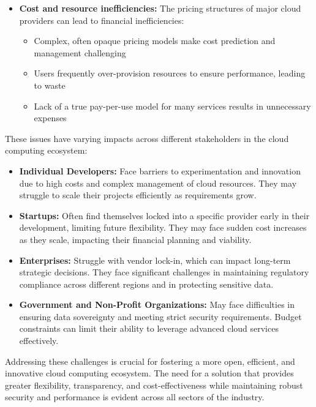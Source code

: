 \begin{itemize}
    \item \textbf{Cost and resource inefficiencies:} The pricing structures of major cloud providers can lead to financial inefficiencies:
    \begin{itemize}
        \item Complex, often opaque pricing models make cost prediction and management challenging
        \item Users frequently over-provision resources to ensure performance, leading to waste
        \item Lack of a true pay-per-use model for many services results in unnecessary expenses
    \end{itemize}
\end{itemize}

These issues have varying impacts across different stakeholders in the cloud computing ecosystem:

\begin{itemize}
    \item \textbf{Individual Developers:} Face barriers to experimentation and innovation due to high costs and complex management of cloud resources. They may struggle to scale their projects efficiently as requirements grow.

    \item \textbf{Startups:} Often find themselves locked into a specific provider early in their development, limiting future flexibility. They may face sudden cost increases as they scale, impacting their financial planning and viability.

    \item \textbf{Enterprises:} Struggle with vendor lock-in, which can impact long-term strategic decisions. They face significant challenges in maintaining regulatory compliance across different regions and in protecting sensitive data.

    \item \textbf{Government and Non-Profit Organizations:} May face difficulties in ensuring data sovereignty and meeting strict security requirements. Budget constraints can limit their ability to leverage advanced cloud services effectively.
\end{itemize}

Addressing these challenges is crucial for fostering a more open, efficient, and innovative cloud computing ecosystem. The need for a solution that provides greater flexibility, transparency, and cost-effectiveness while maintaining robust security and performance is evident across all sectors of the industry.
